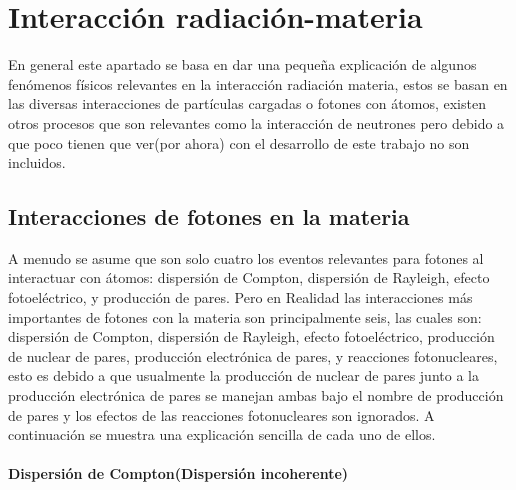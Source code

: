 
\clearpage

\section{Interacción radiación-materia}
\label{sec:INT}
En general este apartado se basa en dar una pequeña explicación de algunos fenómenos físicos relevantes en la interacción radiación materia, estos se basan en las diversas interacciones de partículas cargadas o fotones con átomos, existen otros procesos que son relevantes como la interacción de neutrones pero debido a que poco tienen que ver(por ahora) con el desarrollo de este trabajo no son incluidos.
\subsection{Interacciones de fotones en la materia}
 A menudo se asume que son solo cuatro los eventos relevantes para fotones al interactuar con átomos: dispersión de Compton, dispersión de Rayleigh, efecto fotoeléctrico, y producción de pares.
Pero en Realidad las interacciones más importantes de fotones con la materia son principalmente seis, las cuales son: dispersión de Compton, dispersión de Rayleigh, efecto fotoeléctrico, producción de nuclear de pares, producción electrónica de pares, y reacciones fotonucleares, esto es debido a que usualmente la producción de nuclear de pares junto a la producción electrónica de pares se manejan ambas bajo el nombre de producción de pares y los efectos de las reacciones fotonucleares son ignorados. A continuación se muestra una explicación sencilla de cada uno de ellos.

\paragraph{Dispersión de Compton(Dispersión incoherente)}

